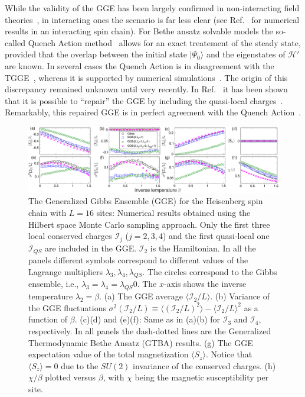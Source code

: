 \documentclass[twocolumn,superscriptaddress,prb,10pt]{revtex4-1}
\begin{document}
While the validity of the GGE has been largely confirmed in non-interacting field 
theories~\cite{calabrese-2011,calabrese-2012,fagotti-2013,kcc14,kcc14a}, in interacting ones the 
scenario is far less clear (see Ref.~ for numerical results in an 
interacting spin chain). For Bethe ansatz solvable models the so-called Quench Action 
method~\cite{caux-2013} allows for an exact treatement of the steady state, 
provided that the overlap between the initial state $|\Psi_0\rangle$ and the eigenstates 
of ${\mathcal H}'$ are known. In several cases the Quench Action is in disagreement with 
the TGGE~\cite{de-nardis-2014,pozsgay-2014,wouters-2014,mestyian-2015}, whereas it is 
supported by numerical simulations~\cite{pozsgay-2014}. 
The origin of this discrepancy remained unknown until very recently. In 
Ref.~ it has been shown that it is possible to 
``repair''  the GGE by including the quasi-local charges~\cite{prosen-2014,
pereira-2014,ilievski-2015}. Remarkably, this repaired GGE is in 
perfect agreement with the Quench Action~\cite{ilievski-2015a}. 

\begin{figure}[t]
\includegraphics*[width=0.93\linewidth]{./draft_figs/fig1}
\caption{The Generalized Gibbs Ensemble (GGE) for the Heisenberg spin chain with 
 $L=16$ sites: Numerical results obtained using the Hilbert space Monte 
 Carlo sampling approach. Only the first three local conserved charges ${\mathcal I}_j$ 
 ($j=2,3,4$) and the first quasi-local one ${\mathcal I}_{QS}$ are included in the GGE. 
 ${\mathcal I}_2$ is the Hamiltonian. In all 
 the panels different symbols correspond to different  values of the Lagrange multipliers 
 $\lambda_3,\lambda_4,\lambda_{QS}$. The circles correspond to the Gibbs ensemble, i.e., 
 $\lambda_3=\lambda_4=\lambda_{QS}0$. The $x$-axis shows the inverse temperature  $\lambda_2=\beta$. 
 (a) The GGE average $\langle {\mathcal I}_2/L\rangle$. (b) Variance 
 of the GGE fluctuations $\sigma^2({\mathcal I}_2/L)\equiv \langle ({\mathcal I}_2/L)^2
 \rangle-\langle {\mathcal I}_2/L\rangle^2$ as a function of $\beta$. (c)(d) and (e)(f): 
 Same as in (a)(b) for ${\mathcal I}_3$ and ${\mathcal I}_4$, respectively. In all panels 
 the dash-dotted lines  are the Generalized Thermodynamic Bethe Ansatz (GTBA) results. 
 (g) The GGE expectation value of the total magnetization 
 $\langle S_z\rangle$. Notice that $\langle S_z\rangle=0$ due to the $SU(2)$ 
 invariance of the conserved charges. (h) $\chi/\beta$ plotted versus $\beta$, with 
 $\chi$ being the magnetic susceptibility per site. 
}
\label{fig1}
\end{figure}
\end{document}
